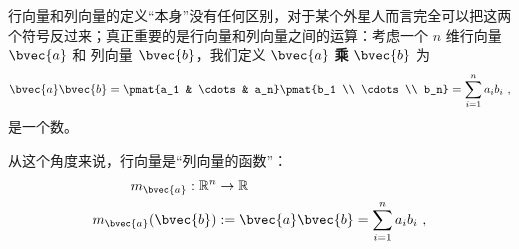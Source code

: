 行向量和列向量的定义“本身”没有任何区别，对于某个外星人而言完全可以把这两个符号反过来；真正重要的是行向量和列向量之间的运算：考虑一个 $n$ 维行向量 $\bvec{a}$ 和 列向量 $\bvec{b}$，我们定义 $\bvec{a}$ \textbf{乘} $\bvec{b}$ 为
\begin{equation}
\bvec{a} \bvec{b} = \pmat{a_1 & \cdots & a_n} \pmat{b_1 \\ \cdots \\ b_n} = \sum_{i = 1}^n a_i b_i~,
\end{equation}
是一个数。


从这个角度来说，行向量是“列向量的函数”：
\begin{equation}
\begin{aligned}
m_{\bvec{a}}: \mathbb{R}^n &\to \mathbb{R} \\
m_{\bvec{a}} (\bvec{b}) &:= \bvec{a} \bvec{b} = \sum_{i = 1}^n a_i b_i~,
\end{aligned}
\end{equation}